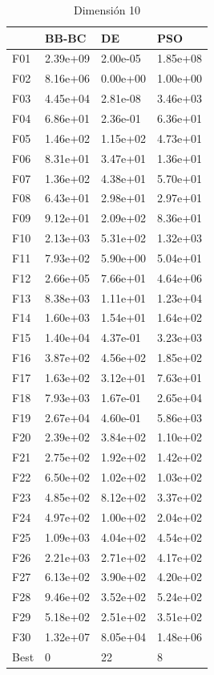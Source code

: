 \begin{table}[H]
    \begin{minipage}{.5\linewidth}
      \caption{Dimensión 10}
      \centering
      \begin{tabular}{llll}
        \toprule
        {} &     BB-BC &        DE &       PSO \\
        \midrule
        F01  &  2.39e+09 &  2.00e-05 &  1.85e+08 \\
        F02  &  8.16e+06 &  0.00e+00 &  1.00e+00 \\
        F03  &  4.45e+04 &  2.81e-08 &  3.46e+03 \\
        F04  &  6.86e+01 &  2.36e-01 &  6.36e+01 \\
        F05  &  1.46e+02 &  1.15e+02 &  4.73e+01 \\
        F06  &  8.31e+01 &  3.47e+01 &  1.36e+01 \\
        F07  &  1.36e+02 &  4.38e+01 &  5.70e+01 \\
        F08  &  6.43e+01 &  2.98e+01 &  2.97e+01 \\
        F09  &  9.12e+01 &  2.09e+02 &  8.36e+01 \\
        F10  &  2.13e+03 &  5.31e+02 &  1.32e+03 \\
        F11  &  7.93e+02 &  5.90e+00 &  5.04e+01 \\
        F12  &  2.66e+05 &  7.66e+01 &  4.64e+06 \\
        F13  &  8.38e+03 &  1.11e+01 &  1.23e+04 \\
        F14  &  1.60e+03 &  1.54e+01 &  1.64e+02 \\
        F15  &  1.40e+04 &  4.37e-01 &  3.23e+03 \\
        F16  &  3.87e+02 &  4.56e+02 &  1.85e+02 \\
        F17  &  1.63e+02 &  3.12e+01 &  7.63e+01 \\
        F18  &  7.93e+03 &  1.67e-01 &  2.65e+04 \\
        F19  &  2.67e+04 &  4.60e-01 &  5.86e+03 \\
        F20  &  2.39e+02 &  3.84e+02 &  1.10e+02 \\
        F21  &  2.75e+02 &  1.92e+02 &  1.42e+02 \\
        F22  &  6.50e+02 &  1.02e+02 &  1.03e+02 \\
        F23  &  4.85e+02 &  8.12e+02 &  3.37e+02 \\
        F24  &  4.97e+02 &  1.00e+02 &  2.04e+02 \\
        F25  &  1.09e+03 &  4.04e+02 &  4.54e+02 \\
        F26  &  2.21e+03 &  2.71e+02 &  4.17e+02 \\
        F27  &  6.13e+02 &  3.90e+02 &  4.20e+02 \\
        F28  &  9.46e+02 &  3.52e+02 &  5.24e+02 \\
        F29  &  5.18e+02 &  2.51e+02 &  3.51e+02 \\
        F30  &  1.32e+07 &  8.05e+04 &  1.48e+06 \\
        Best &         0 &        22 &         8 \\
        \bottomrule
        \end{tabular}
        

\end{minipage}
\end{table}
